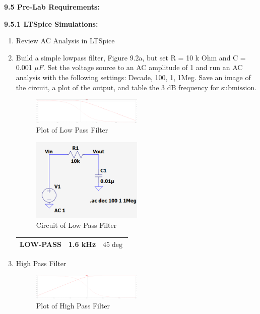 \documentclass{article}
\begin{document}
\textbf{\large 9.5 Pre-Lab Requirements:}

\textbf{9.5.1 LTSpice Simulations:}
\begin{enumerate}
    \item Review AC Analysis in LTSpice
    \item Build a simple lowpass filter, Figure 9.2a, but set R = 10 k Ohm and C =
    0.001 $\mu F$. Set the voltage source to an AC amplitude of 1 and run an AC
    analysis with the following settings: Decade, 100, 1, 1Meg. Save an image of
    the circuit, a plot of the output, and table the 3 dB frequency for submission.
    \begin{figure}[H]
        \centering
        \includegraphics[width=0.5\textwidth]{2simPlot.png}
        \caption{Plot of Low Pass Filter}
    \end{figure}
    \begin{figure}[H]
        \centering
        \includegraphics[width=0.5\textwidth]{2simCircuit.png}
        \caption{Circuit of Low Pass Filter}
    \end{figure}
    \begin{tabular}{|c|c|c|}
        \hline
        LOW-PASS & 1.6 kHz & $45\deg$ \\
        \hline
        \end{tabular}
    \item High Pass Filter
    \begin{figure}[H]
        \centering
        \includegraphics[width=0.5\textwidth]{3simPlot.png}
        \caption{Plot of High Pass Filter}
    \end{figure}
    \begin{figure}[H]

\end{figure}
\end{enumerate}
\end{document}
